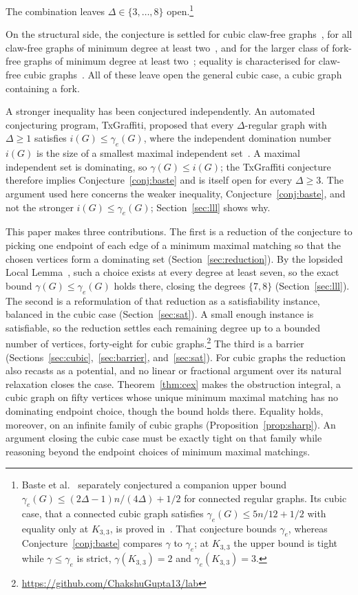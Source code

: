 \documentclass[11pt]{article}
\theoremstyle{definition}
\theoremstyle{remark}
\newcommand{\edom}{\gamma_{e}}
\newcommand{\ind}{i}
\begin{document}
The combination leaves $\Delta \in \{3,\dots,8\}$ open.\footnote{Baste et
al.~\cite{BasteMMM2021} separately conjectured a companion upper bound $\edom(G)
\le (2\Delta-1)n/(4\Delta) + 1/2$ for connected regular graphs. Its cubic case, that
a connected cubic graph satisfies $\edom(G) \le 5n/12 + 1/2$ with equality only at
$K_{3,3}$, is proved in~\cite{CamesVanBatenburg2022}. That conjecture bounds
$\edom$, whereas Conjecture~\ref{conj:baste} compares $\gamma$ to $\edom$; at
$K_{3,3}$ the upper bound is tight while $\gamma \le \edom$ is strict,
$\gamma(K_{3,3}) = 2$ and $\edom(K_{3,3}) = 3$.}

On the structural side, the conjecture is settled for cubic
claw-free graphs~\cite{Baste2020}, for all claw-free graphs of minimum degree at
least two~\cite{Civan2023}, and for the larger class of fork-free graphs of
minimum degree at least two~\cite{ManiyaPradhan2024}; equality is characterised for claw-free
cubic graphs~\cite{PanPanTie2025}. All of these leave
open the general cubic case, a cubic graph containing a fork.

A stronger inequality has been conjectured independently. An automated
conjecturing program, TxGraffiti, proposed that every $\Delta$-regular graph with
$\Delta \ge 1$ satisfies $\ind(G) \le \edom(G)$, where the independent domination number
$\ind(G)$ is the size of a smallest maximal independent
set~\cite{Davila2025reverie}. A maximal independent set is dominating, so
$\gamma(G) \le \ind(G)$; the TxGraffiti conjecture therefore implies
Conjecture~\ref{conj:baste} and is itself open for every $\Delta \ge 3$. The
argument used here concerns the weaker inequality, Conjecture~\ref{conj:baste}, and
not the stronger $\ind(G) \le \edom(G)$; Section~\ref{sec:lll} shows why.

This paper makes three contributions. The first is a reduction of the conjecture to
picking one endpoint of each edge of a minimum maximal matching so that the chosen
vertices form a dominating set (Section~\ref{sec:reduction}). By the lopsided Local
Lemma~\cite{ErdosSpencer1991}, such a choice exists at every degree at least seven,
so the exact bound $\gamma(G) \le \edom(G)$ holds there, closing the degrees
$\{7,8\}$ (Section~\ref{sec:lll}). The
second is a reformulation of that reduction as a satisfiability instance,
balanced in the cubic case (Section~\ref{sec:sat}). A small enough instance is
satisfiable, so the reduction settles each remaining degree up to a bounded number
of vertices, forty-eight for cubic graphs.\footnote{\url{https://github.com/ChakshuGupta13/lab}}
The third is a barrier (Sections~\ref{sec:cubic},~\ref{sec:barrier}, and~\ref{sec:sat}).
For cubic graphs the reduction also recasts as a potential, and no linear or
fractional argument over its natural relaxation closes the case.
Theorem~\ref{thm:cex} makes the obstruction integral, a cubic graph on fifty
vertices whose unique minimum maximal matching has no dominating endpoint choice,
though the bound holds there. Equality holds, moreover, on an infinite family of
cubic graphs (Proposition~\ref{prop:sharp}). An argument closing the cubic case
must be exactly tight on that family while reasoning beyond the endpoint choices
of minimum maximal matchings.
\end{document}
